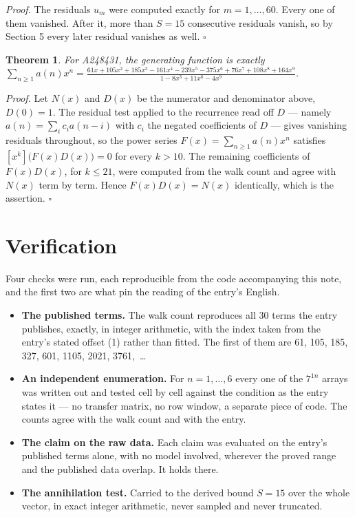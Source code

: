 \documentclass[11pt]{article}
\newtheorem{theorem}{Theorem}
\theoremstyle{definition}
\begin{document}
{\itshape Proof.} The residuals $u_m$ were computed exactly for $m = 1,\dots,60$. Every one of them vanished. After it, more than $S = 15$ consecutive residuals vanish, so by Section 5 every later residual vanishes as well. $\square$

\begin{theorem} For A248431, the generating function is exactly $\sum_{n\ge 1} a(n)x^n = \frac{61x + 105x^{2} + 185x^{3} - 161x^{4} - 239x^{5} - 375x^{6} + 76x^{7} + 108x^{8} + 164x^{9}}{1 - 8x^{3} + 11x^{6} - 4x^{9}}$.\end{theorem}

{\itshape Proof.} Let $N(x)$ and $D(x)$ be the numerator and denominator above, $D(0)=1$. The residual test applied to the recurrence read off $D$ --- namely $a(n) = \sum_i c_i a(n-i)$ with $c_i$ the negated coefficients of $D$ --- gives vanishing residuals throughout, so the power series $F(x)=\sum_{n\ge 1}a(n)x^n$ satisfies $[x^k]\bigl(F(x)D(x)\bigr) = 0$ for every $k > 10$. The remaining coefficients of $F(x)D(x)$, for $k \le 21$, were computed from the walk count and agree with $N(x)$ term by term. Hence $F(x)D(x) = N(x)$ identically, which is the assertion. $\square$

\section{Verification}

Four checks were run, each reproducible from the code accompanying this note, and the first two are what pin the reading of the entry's English.

\begin{itemize}

\item {\bfseries The published terms.} The walk count reproduces all 30 terms the entry publishes, exactly, in integer arithmetic, with the index taken from the entry's stated offset (1) rather than fitted. The first of them are 61, 105, 185, 327, 601, 1105, 2021, 3761,~\dots

\item {\bfseries An independent enumeration.} For $n = 1,\dots,6$ every one of the $7^{1n}$ arrays was written out and tested cell by cell against the condition as the entry states it --- no transfer matrix, no row window, a separate piece of code. The counts agree with the walk count and with the entry.

\item {\bfseries The claim on the raw data.} Each claim was evaluated on the entry's published terms alone, with no model involved, wherever the proved range and the published data overlap. It holds there.

\item {\bfseries The annihilation test.} Carried to the derived bound $S = 15$ over the whole vector, in exact integer arithmetic, never sampled and never truncated.

\end{itemize}
\end{document}
